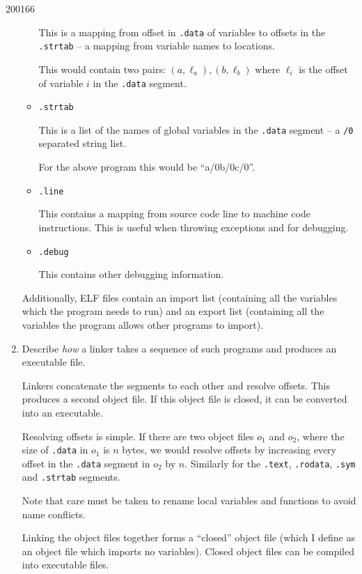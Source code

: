 \documentclass[10pt,\jkfside,a4paper]{article}
\begin{document}
\begin{examquestion}{2001}{6}{6}
\begin{enumerate}
\begin{itemize}
This is a mapping from offset in \texttt{.data} of variables to offsets in
the \texttt{.strtab} -- a mapping from variable names to locations.

This would contain two pairs: $(a, \ell_a), (b, \ell_b)$ where $\ell_i$ is
the offset of variable $i$ in the \texttt{.data} segment.

\item \texttt{.strtab}

This is a list of the names of global variables in the \texttt{.data}
segment -- a \texttt{/0} separated string list.

For the above program this would be ``a/0b/0c/0''.

\item \texttt{.line}

This contains a mapping from source code line to machine code instructions.
This is useful when throwing exceptions and for debugging.

\item \texttt{.debug}

This contains other debugging information.

\end{itemize}

Additionally, ELF files contain an import list (containing all the
variables which the program needs to run) and an export list (containing
all the variables the program allows other programs to import).

\item Describe \textit{how} a linker takes a sequence of such programs and
produces an executable file.

Linkers concatenate the segments to each other and resolve offsets.
This produces a second object file. If this object file is closed, it can
be converted into an executable.

Resolving offsets is simple. If there are two object files $o_1$ and
$o_2$, where the size of \texttt{.data} in $o_1$ is $n$ bytes, we would
resolve offsets by increasing every offset in the \texttt{.data} segment
in $o_2$ by $n$. Similarly for the \texttt{.text},
\texttt{.rodata}, \texttt{.sym} and \texttt{.strtab} segments.

Note that care must be taken to rename local variables and functions to avoid
name conflicts.

Linking the object files together forms a ``closed'' object file (which I
define as an object file which imports no variables). Closed object files
can be compiled into executable files.


\end{enumerate}
\end{examquestion}
\end{document}
